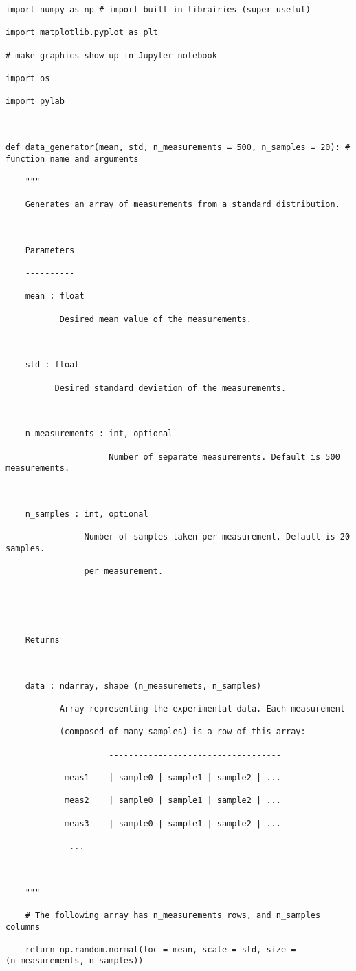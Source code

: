 \documentclass[12pt]{article}
\begin{document}

\begin{lstlisting}[frame=shadowbox]
import numpy as np # import built-in librairies (super useful)

import matplotlib.pyplot as plt

# make graphics show up in Jupyter notebook

import os

import pylab



def data_generator(mean, std, n_measurements = 500, n_samples = 20): # function name and arguments

    """

    Generates an array of measurements from a standard distribution.



    Parameters

    ----------

    mean : float

           Desired mean value of the measurements.

           

    std : float

          Desired standard deviation of the measurements.

          

    n_measurements : int, optional

                     Number of separate measurements. Default is 500 measurements.



    n_samples : int, optional

                Number of samples taken per measurement. Default is 20 samples. 

                per measurement.





    Returns

    -------

    data : ndarray, shape (n_measuremets, n_samples)

           Array representing the experimental data. Each measurement 

           (composed of many samples) is a row of this array:

                     -----------------------------------

            meas1    | sample0 | sample1 | sample2 | ...

            meas2    | sample0 | sample1 | sample2 | ...

            meas3    | sample0 | sample1 | sample2 | ...

             ...



    """

    # The following array has n_measurements rows, and n_samples columns

    return np.random.normal(loc = mean, scale = std, size = (n_measurements, n_samples))
\end{lstlisting}
\end{document}
